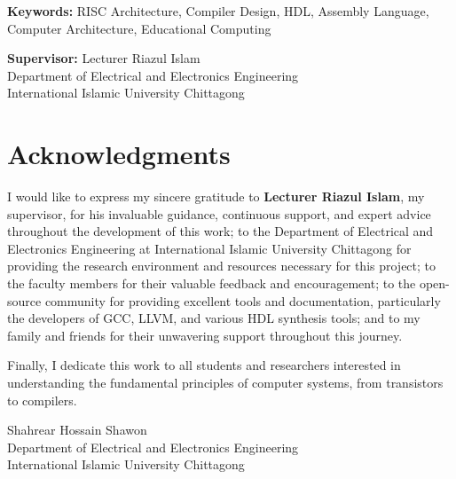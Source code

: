 \documentclass[12pt,a4paper,oneside]{book}
\begin{document}
\textbf{Keywords:} RISC Architecture, Compiler Design, HDL, Assembly Language, Computer Architecture, Educational Computing

\vspace{1cm}

\noindent
\textbf{Supervisor:} Lecturer Riazul Islam\\
Department of Electrical and Electronics Engineering\\
International Islamic University Chittagong

\chapter*{Acknowledgments}

I would like to express my sincere gratitude to \textbf{Lecturer Riazul Islam}, my supervisor, for his invaluable guidance, continuous support, and expert advice throughout the development of this work; to the Department of Electrical and Electronics Engineering at International Islamic University Chittagong for providing the research environment and resources necessary for this project; to the faculty members for their valuable feedback and encouragement; to the open-source community for providing excellent tools and documentation, particularly the developers of GCC, LLVM, and various HDL synthesis tools; and to my family and friends for their unwavering support throughout this journey.

Finally, I dedicate this work to all students and researchers interested in understanding the fundamental principles of computer systems, from transistors to compilers.

\vspace{1cm}

\noindent
Shahrear Hossain Shawon\\
Department of Electrical and Electronics Engineering\\
International Islamic University Chittagong

\setcounter{tocdepth}{3}  %
\setcounter{secnumdepth}{3}  %
\tableofcontents
\newpage
\end{document}

